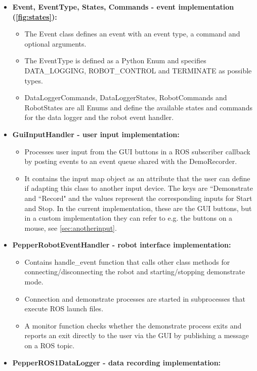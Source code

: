 \documentclass{CSSRforAfrica}
\begin{document}
\begin{itemize}
    \item \textbf{Event, EventType, States, Commands - event implementation (\cref{fig:states}):} 
    \begin{itemize}
        \item The Event class defines an event with an event type, a command and optional arguments.
        \item The EventType is defined as a Python Enum and specifies DATA\_LOGGING, ROBOT\_CONTROL and TERMINATE as possible types.
        \item DataLoggerCommands, DataLoggerStates, RobotCommands and RobotStates are all Enums and define the available states and commands for the data logger and the robot event handler.
    \end{itemize}
    \item \textbf{GuiInputHandler - user input implementation:} 
    \begin{itemize}
        \item Processes user input from the GUI buttons in a ROS subscriber callback by posting events to an event queue shared with the DemoRecorder.
        \item It contains the input map object as an attribute that the user can define if adapting this class to another input device. The keys are ``Demonstrate and ``Record" and the values represent the corresponding inputs for Start and Stop. In the current implementation, these are the GUI buttons, but in a custom implementation they can refer to e.g. the buttons on a mouse, see \cref{sec:anotherinput}.
    \end{itemize}
    \item \textbf{PepperRobotEventHandler - robot interface implementation:}
    \begin{itemize}
        \item Contains handle\_event function that calls other class methods for connecting/disconnecting the robot and starting/stopping demonstrate mode. 
        \item Connection and demonstrate processes are started in subprocesses that execute ROS launch files.
        \item A monitor function checks whether the demonstrate process exits and reports an exit directly to the user via the GUI by publishing a message on a ROS topic.
    \end{itemize}
    \item \textbf{PepperROS1DataLogger - data recording implementation:}

\end{itemize}
\end{document}
